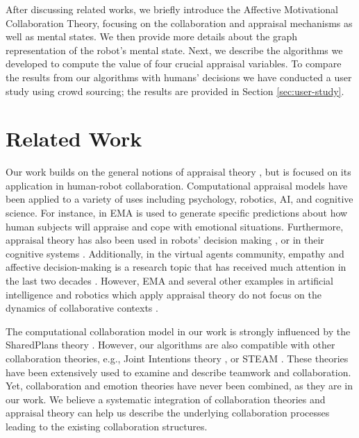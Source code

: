 \documentclass{article}
\begin{document}
After discussing related works, we briefly introduce the Affective Motivational
Collaboration Theory, focusing on the collaboration and appraisal mechanisms as
well as mental states. We then provide more details about the graph
representation of the robot's mental state. Next, we describe the algorithms we
developed to compute the value of four crucial appraisal variables. To compare
the results from our algorithms with humans' decisions we have conducted a user
study using crowd sourcing; the results are provided in Section
\ref{sec:user-study}.

\section{Related Work}

Our work builds on the general notions of appraisal theory
\cite{gratch:domain-independent,marsella:computational,scherer:sequential-appraisal-process,scherer:appraisal-processes},
but is focused on its application in human-robot collaboration. Computational
appraisal models have been applied to a variety of uses including psychology,
robotics, AI, and cognitive science. For instance, in
\cite{marsella:ema-process-model} EMA is used to generate specific predictions
about how human subjects will appraise and cope with emotional situations.
Furthermore, appraisal theory has also been used in robots' decision making
\cite{castro:autonomous-robot-fear}, or in their cognitive systems
\cite{hudlicka:emotinos-reasons,marinier:emotion-reinforcement}. Additionally,
in the virtual agents community, empathy and affective decision-making is a
research topic that has received much attention in the last two decades
\cite{scott:modeling-empathy-agent,paiva:agent-care,pontier:women-robot-men,velasquez:emotions-motivations-agents}.
However, EMA and several other examples in artificial intelligence and robotics
which apply appraisal theory do not focus on the dynamics of collaborative
contexts
\cite{adam:bdi-emotional-companion,kim:model-hri-appraisal,marsella:ema-process-model,rosenbloom:sigma-appraisal}.

The computational collaboration model in our work is strongly influenced by the
SharedPlans theory \cite{grosz:plans-discourse}. However, our algorithms are
also compatible with other collaboration theories, e.g., Joint Intentions theory
\cite{cohen:teamwork}, or STEAM \cite{tambe:flexible-teamwork}. These theories
have been extensively used to examine and describe teamwork and collaboration.
Yet, collaboration and emotion theories have never been combined, as they are in
our work. We believe a systematic integration of collaboration theories and
appraisal theory can help us describe the underlying collaboration processes
leading to the existing collaboration structures.
\end{document}
